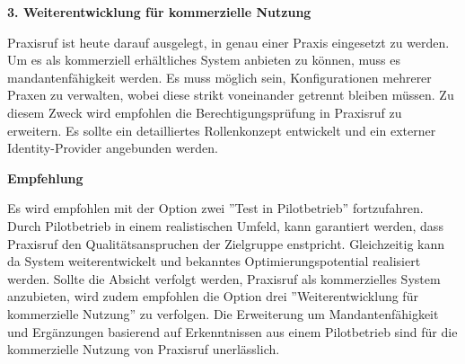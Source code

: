 \textbf{3. Weiterentwicklung für kommerzielle Nutzung}

Praxisruf ist heute darauf ausgelegt, in genau einer Praxis eingesetzt zu werden.
Um es als kommerziell erhältliches System anbieten zu können, muss es mandantenfähigkeit werden.
Es muss möglich sein, Konfigurationen mehrerer Praxen zu verwalten, wobei diese strikt voneinander getrennt bleiben müssen.
Zu diesem Zweck wird empfohlen die Berechtigungsprüfung in Praxisruf zu erweitern.
Es sollte ein detailliertes Rollenkonzept entwickelt und ein externer Identity-Provider angebunden werden.

\textbf{Empfehlung}

Es wird empfohlen mit der Option zwei ''Test in Pilotbetrieb'' fortzufahren.
Durch Pilotbetrieb in einem realistischen Umfeld, kann garantiert werden, dass Praxisruf den Qualitätsanspruchen der Zielgruppe enstpricht.
Gleichzeitig kann da System weiterentwickelt und bekanntes Optimierungspotential realisiert werden.
Sollte die Absicht verfolgt werden, Praxisruf als kommerzielles System anzubieten, wird zudem empfohlen die Option drei ''Weiterentwicklung für kommerzielle Nutzung'' zu verfolgen.
Die Erweiterung um Mandantenfähigkeit und Ergänzungen basierend auf Erkenntnissen aus einem Pilotbetrieb sind für die kommerzielle Nutzung von Praxisruf unerlässlich.

\clearpage
